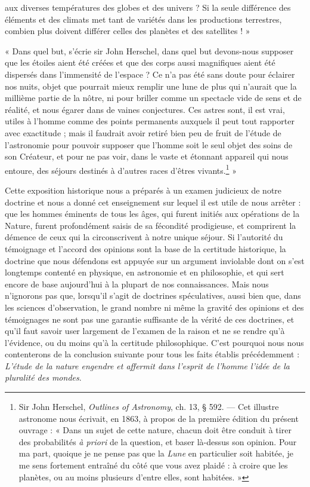 \documentclass[a4paper, 11pt, oneside]{article}
\begin{document}
aux diverses températures des globes et des univers ? Si la seule différence des éléments et des climats met tant de variétés dans les productions terrestres, combien plus doivent différer celles des planètes et des satellites ! »

« Dans quel but, s'écrie sir John Herschel, dans quel but devons-nous supposer que les étoiles aient été créées et que des corps aussi magnifiques aient été dispersés dans l'immensité de l'espace ? Ce n'a pas été sans doute pour éclairer nos nuits, objet que pourrait mieux remplir une lune de plus qui n'aurait que la millième partie de la nôtre, ni pour briller comme un spectacle vide de sens et de réalité, et nous égarer dans de vaines conjectures. Ces astres sont, il est vrai, utiles à l'homme comme des points permanents auxquels il peut tout rapporter avec exactitude ; mais il faudrait avoir retiré bien peu de fruit de l'étude de l'astronomie pour pouvoir supposer que l'homme soit le seul objet des soins de son Créateur, et pour ne pas voir, dans le vaste et étonnant appareil qui nous entoure, des séjours destinés à d'autres races d'êtres vivants.\footnote{Sir John Herschel, \emph{Outlines of Astronomy}, ch. 13, § 592. --- Cet illustre astronome nous écrivait, en 1863, à propos de la première édition du présent ouvrage : « Dans un sujet de cette nature, chacun doit être conduit à tirer des probabilités \emph{à priori} de la question, et baser là-dessus son opinion. Pour ma part, quoique je ne pense pas que la \emph{Lune} en particulier soit habitée, je me sens fortement entraîné du côté que vous avez plaidé : à croire que les planètes, ou au moins plusieurs d'entre elles, sont habitées. »} »

Cette exposition historique nous a préparés à un examen judicieux de notre doctrine et nous a donné cet enseignement sur lequel il est utile de nous arrêter : que les hommes éminents de tous les âges, qui furent initiés aux opérations de la Nature, furent profondément saisis de sa fécondité prodigieuse, et comprirent la démence de ceux qui la circonscrivent à notre unique séjour. Si l'autorité du témoignage et l'accord des opinions sont la base de la certitude historique, la doctrine que nous défendons est appuyée sur un argument inviolable dont on s'est longtemps contenté en physique, en astronomie et en philosophie, et qui sert encore de base aujourd'hui à la plupart de nos connaissances. Mais nous n'ignorons pas que, lorsqu'il s'agit de doctrines spéculatives, aussi bien que, dans les sciences d'observation, le grand nombre ni même la gravité des opinions et des témoignages ne sont pas une garantie suffisante de la vérité de ces doctrines, et qu'il faut savoir user largement de l'examen de la raison et ne se rendre qu'à l'évidence, ou du moins qu'à la certitude philosophique. C'est pourquoi nous nous contenterons de la conclusion suivante pour tous les faits établis précédemment : \emph{L'étude de la nature engendre et affermit dans l'esprit de l'homme l'idée de la pluralité des mondes}.
\end{document}
